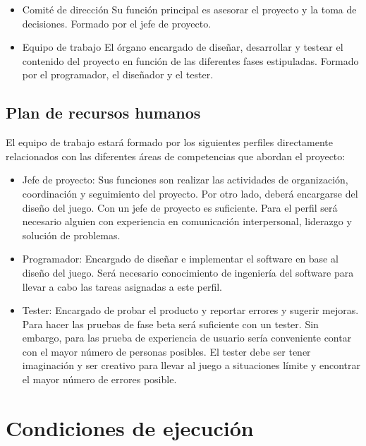 			\begin{itemize}
				\item Comité de dirección 
				Su función principal es asesorar el proyecto y la toma de decisiones. Formado por el jefe de proyecto.
				\item Equipo de trabajo
				El órgano encargado de diseñar, desarrollar y testear el contenido del proyecto en función de las diferentes fases estipuladas. Formado por el programador, el diseñador y el tester.
			\end{itemize}

		\subsection{Plan de recursos humanos}

			\label{sec:planRecursosHumanos}

			El equipo de trabajo estará formado por los siguientes perfiles directamente relacionados con las diferentes áreas de competencias que abordan el proyecto:

			\begin{itemize}
				\item Jefe de proyecto:
				Sus funciones son realizar las actividades de organización, coordinación y seguimiento del proyecto. Por otro lado, deberá encargarse del diseño del juego. Con un jefe de proyecto es suficiente. Para el perfil será necesario alguien con experiencia en comunicación interpersonal, liderazgo y solución de problemas.
				\item Programador:
				Encargado de diseñar e implementar el software en base al diseño del 	juego. Será necesario conocimiento de ingeniería del software para llevar a cabo las tareas asignadas a este perfil.
				\item Tester:
				Encargado de probar el producto y reportar errores y sugerir mejoras. 	Para hacer las 	pruebas de fase beta será suficiente con un tester. 	Sin embargo, para las prueba de 	experiencia de usuario sería 	conveniente contar con el mayor número de personas 	posibles. El tester debe ser tener imaginación y ser creativo para llevar al juego a situaciones límite y encontrar el mayor número de errores posible.
			\end{itemize}

	\section{Condiciones de ejecución}

